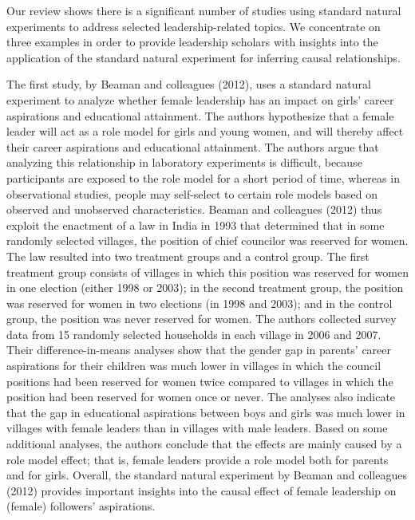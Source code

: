 \documentclass[english]{article}
\begin{document}
\noindent Our review shows there is a significant number of studies using standard
natural experiments to address selected leadership-related topics. We
concentrate on three examples in order to provide leadership scholars
with insights into the application of the standard natural experiment
for inferring causal relationships.

The first study, by Beaman and colleagues (2012), uses a standard
natural experiment to analyze whether female leadership has an impact on
girls' career aspirations and educational attainment. The authors
hypothesize that a female leader will act as a role model for girls and
young women, and will thereby affect their career aspirations and
educational attainment. The authors argue that analyzing this
relationship in laboratory experiments is difficult, because
participants are exposed to the role model for a short period of time,
whereas in observational studies, people may self-select to certain role
models based on observed and unobserved characteristics. Beaman and
colleagues (2012) thus exploit the enactment of a law in India in 1993
that determined that in some randomly selected villages, the position of
chief councilor was reserved for women. The law resulted into two
treatment groups and a control group. The first treatment group consists
of villages in which this position was reserved for women in one
election (either 1998 or 2003); in the second treatment group, the
position was reserved for women in two elections (in 1998 and 2003); and
in the control group, the position was never reserved for women. The
authors collected survey data from 15 randomly selected households in
each village in 2006 and 2007. Their difference-in-means analyses show
that the gender gap in parents' career aspirations for their children
was much lower in villages in which the council positions had been
reserved for women twice compared to villages in which the position had
been reserved for women once or never. The analyses also indicate that
the gap in educational aspirations between boys and girls was much lower
in villages with female leaders than in villages with male leaders.
Based on some additional analyses, the authors conclude that the effects
are mainly caused by a role model effect; that is, female leaders
provide a role model both for parents and for girls. Overall, the
standard natural experiment by Beaman and colleagues (2012) provides
important insights into the causal effect of female leadership on
(female) followers' aspirations.
\end{document}
